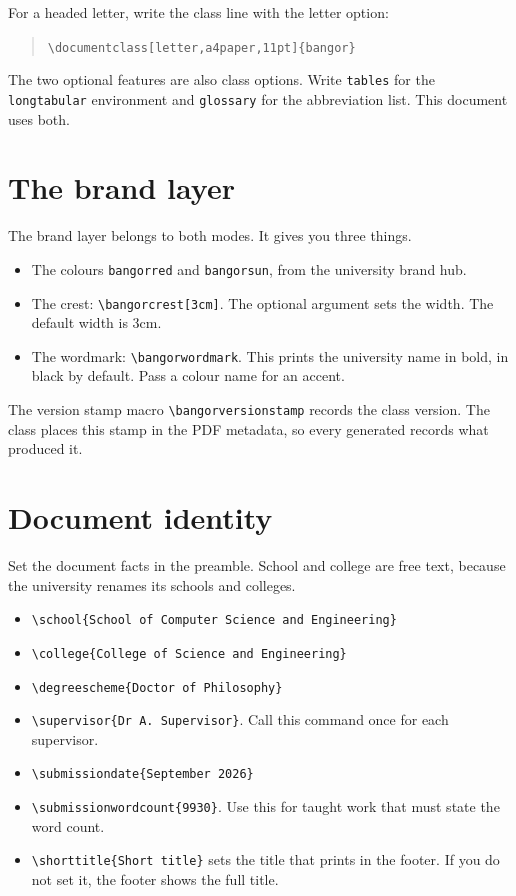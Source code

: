 \documentclass[dissertation,tables,glossary,12pt,a4paper]{bangor}
\begin{document}
For a headed letter, write the class line with the letter option:

\begin{quote}
  \verb|\documentclass[letter,a4paper,11pt]{bangor}|
\end{quote}

The two optional features are also class options. Write \verb|tables| for the \verb|longtabular| environment and \verb|glossary| for the abbreviation list. This document uses both.

\chapter{The brand layer}
The brand layer belongs to both modes. It gives you three things.

\begin{itemize}
  \item The colours \verb|bangorred| and \verb|bangorsun|, from the university brand hub.
  \item The crest: \verb|\bangorcrest[3cm]|. The optional argument sets the width. The default width is 3cm.
  \item The wordmark: \verb|\bangorwordmark|. This prints the university name in bold, in black by default. Pass a colour name for an accent.
\end{itemize}

The version stamp macro \verb|\bangorversionstamp| records the class version. The class places this stamp in the PDF metadata, so every generated  records what produced it.

\chapter{Document identity}
Set the document facts in the preamble. School and college are free text, because the university renames its schools and colleges.

\begin{itemize}
  \item \verb|\school{School of Computer Science and Engineering}|
  \item \verb|\college{College of Science and Engineering}|
  \item \verb|\degreescheme{Doctor of Philosophy}|
  \item \verb|\supervisor{Dr A. Supervisor}|. Call this command once for each supervisor.
  \item \verb|\submissiondate{September 2026}|
  \item \verb|\submissionwordcount{9930}|. Use this for taught work that must state the word count.
  \item \verb|\shorttitle{Short title}| sets the title that prints in the footer. If you do not set it, the footer shows the full title.
\end{itemize}
\end{document}
